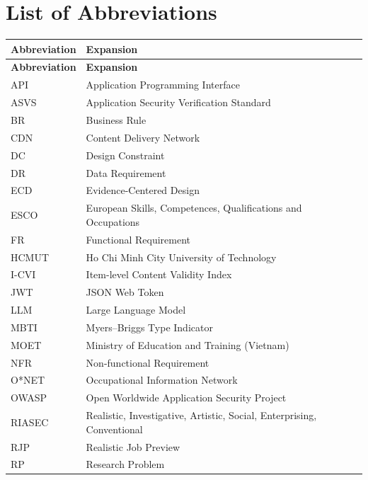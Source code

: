 \section*{List of Abbreviations}

{\small
\begin{longtable}{|>{\raggedright\arraybackslash}p{}|>{\raggedright\arraybackslash}p{}|}
\hline
\textbf{Abbreviation} & \textbf{Expansion} \\ \hline
\endfirsthead
\hline
\textbf{Abbreviation} & \textbf{Expansion} \\ \hline
\endhead
API & Application Programming Interface \\ \hline
ASVS & Application Security Verification Standard \\ \hline
BR & Business Rule \\ \hline
CDN & Content Delivery Network \\ \hline
DC & Design Constraint \\ \hline
DR & Data Requirement \\ \hline
ECD & Evidence-Centered Design \\ \hline
ESCO & European Skills, Competences, Qualifications and Occupations \\ \hline
FR & Functional Requirement \\ \hline
HCMUT & Ho Chi Minh City University of Technology \\ \hline
I-CVI & Item-level Content Validity Index \\ \hline
JWT & JSON Web Token \\ \hline
LLM & Large Language Model \\ \hline
MBTI & Myers--Briggs Type Indicator \\ \hline
MOET & Ministry of Education and Training (Vietnam) \\ \hline
NFR & Non-functional Requirement \\ \hline
O*NET & Occupational Information Network \\ \hline
OWASP & Open Worldwide Application Security Project \\ \hline
RIASEC & Realistic, Investigative, Artistic, Social, Enterprising, Conventional \\ \hline
RJP & Realistic Job Preview \\ \hline
RP & Research Problem \\ \hline

\end{longtable}}
